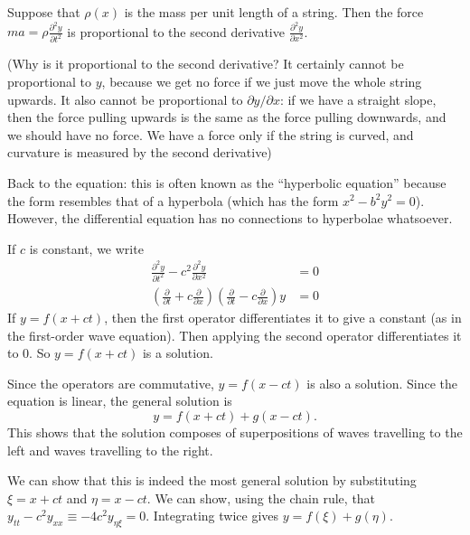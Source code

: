 \documentclass[a4paper]{article}
\begin{document}
\begin{center}
\end{center}

Suppose that $\rho(x)$ is the mass per unit length of a string. Then the force $\displaystyle ma = \rho \frac{\partial ^2 y}{\partial t^2}$ is proportional to the second derivative $\displaystyle\frac{\partial^2 y}{\partial x^2}$.

(Why is it proportional to the second derivative? It certainly cannot be proportional to $y$, because we get no force if we just move the whole string upwards. It also cannot be proportional to $\partial y/\partial x$: if we have a straight slope, then the force pulling upwards is the same as the force pulling downwards, and we should have no force. We have a force only if the string is curved, and curvature is measured by the second derivative)

Back to the equation: this is often known as the ``hyperbolic equation'' because the form resembles that of a hyperbola (which has the form $x^2 - b^2 y^2 = 0$). However, the differential equation has no connections to hyperbolae whatsoever.

If $c$ is constant, we write
\begin{align*}
  \frac{\partial ^2 y}{\partial t^2} - c^2 \frac{\partial^2 y}{\partial x^2} &= 0\\
  \left(\frac{\partial}{\partial t} + c\frac{\partial}{\partial x}\right)\left(\frac{\partial}{\partial t} - c\frac{\partial}{\partial x}\right) y &= 0
\end{align*}
If $y = f(x + ct)$, then the first operator differentiates it to give a constant (as in the first-order wave equation). Then applying the second operator differentiates it to $0$. So $y = f(x + ct)$ is a solution.

Since the operators are commutative, $y = f(x - ct)$ is also a solution. Since the equation is linear, the general solution is
\[
y = f(x + ct) + g(x - ct).
\]
This shows that the solution composes of superpositions of waves travelling to the left and waves travelling to the right.

\note We can show that this is indeed the most general solution by substituting $\xi = x + ct$ and $\eta = x - ct$. We can show, using the chain rule, that $y_{tt} - c^2 y_{xx} \equiv -4c^2 y_{\eta\xi} = 0$. Integrating twice gives $y = f(\xi) + g(\eta)$.
\end{document}
